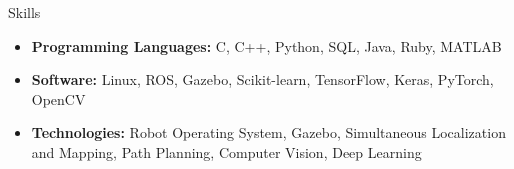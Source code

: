 \documentclass[]{../mcdowellcv}
\begin{document}
\begin{cvsection}{Skills}
    \begin{cvsubsection}{}{}{}
        \begin{itemize}
            \item \textbf{Programming Languages:} C, C++, Python, SQL, Java, Ruby, MATLAB
            \item \textbf{Software:} Linux, ROS, Gazebo, Scikit-learn, TensorFlow, Keras, PyTorch, OpenCV
            \item \textbf{Technologies:} Robot Operating System, Gazebo, Simultaneous Localization and Mapping, Path Planning, Computer Vision, Deep Learning
        \end{itemize}
    \end{cvsubsection}
\end{cvsection}
\end{document}
